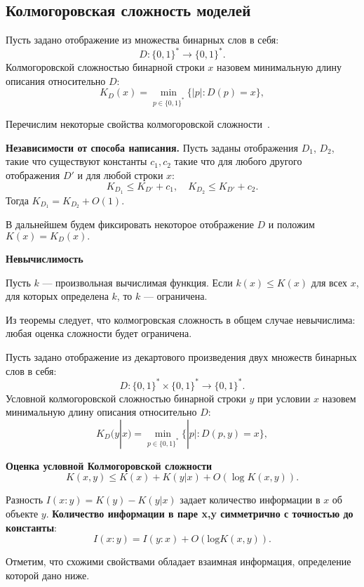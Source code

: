 \documentclass[../main.tex]{subfiles}
\begin{document}
\subsection{Колмогоровская сложность моделей}

\begin{definition}
Пусть задано отображение из множества бинарных слов в себя:
\[
D: \{0,1\}^{*}  \to  \{0,1\}^{*}.
\]
Колмогоровской сложностью бинарной строки $x$ назовем минимальную длину описания относительно $D$:
\[
K_D(x) = \min_{p \in \{0,1\}^*}\{|p|: D(p) = x\},
\]
\end{definition}


Перечислим некоторые свойства колмогоровской сложности~\cite{kolmogorov}.

\textbf{Независимости от способа написания.}
Пусть заданы  отображения $D_1$, $D_2$, такие что существуют константы $c_1, c_2$ такие что для любого другого отображения $D'$ и для любой строки $x$:
\[
	K_{D_1} \leq K_{D'} + c_1, \quad K_{D_2} \leq K_{D'} + c_2.
\]
Тогда $K_{D_1} = K_{D_2} + O(1).$

В дальнейшем будем фиксировать некоторое отображение $D$ и положим $K(x) = K_D(x).$

\textbf{Невычислимость }
\begin{theorem}
Пусть $k$ --- произвольная вычислимая функция. Если $k(x) \leq K(x) $ для всех $x$, для которых определена $k$, то $k$ --- ограничена.
\end{theorem}
Из теоремы следует, что колмогровская сложность в общем случае невычислима: любая оценка сложности будет ограничена.


\begin{definition}
Пусть задано отображение из декартового произведения двух множеств бинарных слов в себя:
\[
D: \{0,1\}^{*} \times  \{0,1\}^{*} \to  \{0,1\}^{*}.
\]
Условной колмогоровской сложностью бинарной строки $y$ при условии $x$ назовем минимальную длину описания относительно $D$:
\[
K_D(y|x) = \min_{p \in \{0,1\}^*}\{|p|: D(p, y) = x\},
\]
\end{definition}

\textbf{Оценка условной Колмогоровской сложности}~\cite{kolmogorov}
\[
	K(x,y) \leq K(x) + K(y|x) + O(\log K(x,y)).
\]


Разность $I(x:y) = K(y) - K(y|x)$ задает количество информации в $x$ об объекте $y$. 
\textbf{Количество информации в паре x,y симметрично с точностью до константы}:
\[
I(x:y) = I(y:x) + O(\text{log}K(x,y)).
\]

Отметим, что схожими свойствами обладает взаимная информация, определение которой дано ниже.
\end{document}
